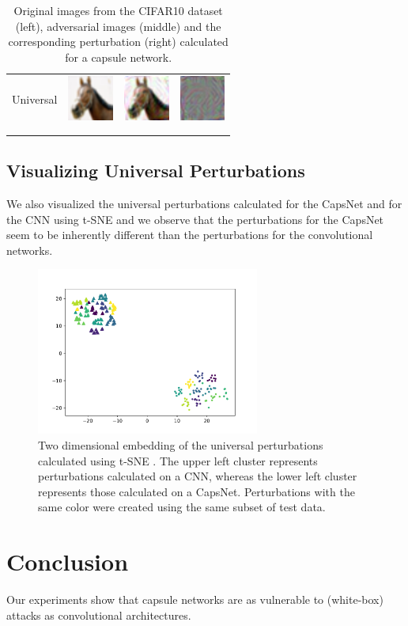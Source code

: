 \documentclass{article}
\begin{document}
\begin{table}[h]
\begin{tabular}{rlll}
	\\
	Universal & \includegraphics[height=1.5cm, align=c]{figures/universal_orig.pdf} & \includegraphics[height=1.5cm, align=c]{figures/universal_adversarial.pdf} & \includegraphics[height=1.5cm, align=c]{figures/universal_diff.pdf}\\
	\\
	\vspace{0.1cm}\\
	\end{tabular}
	\label{tab:images}
	\caption{Original images from the CIFAR10 dataset (left), adversarial images (middle) and the corresponding perturbation (right) calculated for a capsule network.}
\end{table}

\subsection{Visualizing Universal Perturbations}

We also visualized the universal perturbations calculated for the CapsNet and for the CNN using t-SNE \cite{tsne} and we observe that the perturbations for the CapsNet seem to be inherently different than the perturbations for the convolutional networks.
\begin{figure}
	\centering
	\includegraphics[height=5.5cm]{figures/tsne.pdf}
	\caption{Two dimensional embedding of the universal perturbations calculated using t-SNE \cite{tsne}. The upper left cluster represents perturbations calculated on a CNN, whereas the lower left cluster represents those calculated on a CapsNet. Perturbations with the same color were created using the same subset of test data.}
\end{figure}


\FloatBarrier
\section{Conclusion}
Our experiments show that capsule networks are as vulnerable to (white-box) attacks as convolutional architectures.



\end{document}
